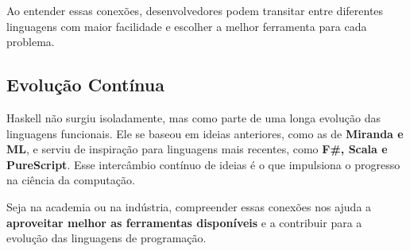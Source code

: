 Ao entender essas conexões, desenvolvedores podem transitar entre diferentes linguagens com maior facilidade e escolher a melhor ferramenta para cada problema.

\subsection{Evolução Contínua}

Haskell não surgiu isoladamente, mas como parte de uma longa evolução das linguagens funcionais. Ele se baseou em ideias anteriores, como as de \textbf{Miranda e ML}, e serviu de inspiração para linguagens mais recentes, como \textbf{F#, Scala e PureScript}. Esse intercâmbio contínuo de ideias é o que impulsiona o progresso na ciência da computação.

Seja na academia ou na indústria, compreender essas conexões nos ajuda a \textbf{aproveitar melhor as ferramentas disponíveis} e a contribuir para a evolução das linguagens de programação.
